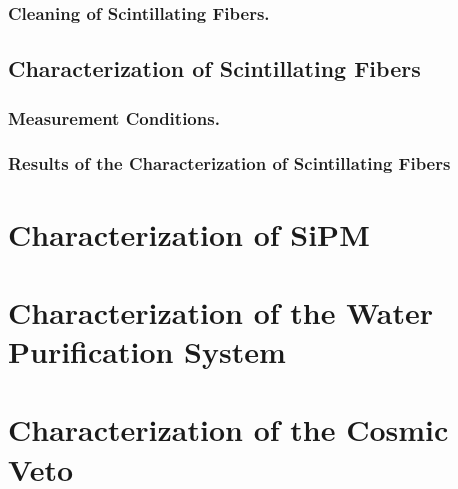 \documentclass[12pt,a4paper]{book}
\begin{document}
			\subsubsection{Cleaning of Scintillating Fibers.}\label{subsubsec:CleaningProcess}
			
			
		\subsection{Characterization of Scintillating Fibers}\label{subsec:CharacterizationFibers}
		
		
			\subsubsection{Measurement Conditions.}\label{subsubsec:CharacterizationSystem}
			
		
			\subsubsection{Results of the Characterization of Scintillating Fibers}\label{subsubsec:CharacterizationFibers}
			
				
	\section[Characterization of the SiPM]{Characterization of SiPM}\label{sec:CharacterizationSiPM}
	
	
	\section{Characterization of the Water Purification System}\label{sec:CharacterizationUltraPureWaterSystem}
	
					 
	\section[Characterization of the Cosmic Veto]{Characterization of the Cosmic Veto}\label{sec:TritiumActiveVeto}
	
\end{document}
